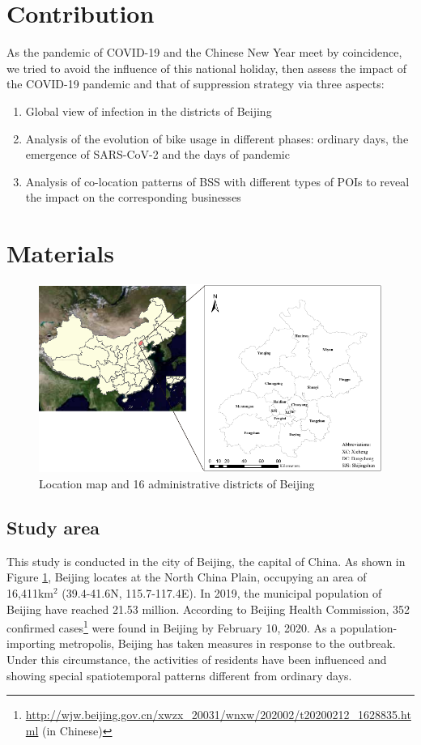 \documentclass[preprints,ijgi,submit,moreauthors]{Definitions/mdpi}
\begin{document}
\section*{Contribution} As the pandemic of COVID-19 and the Chinese New Year meet by coincidence, we tried to avoid the influence of this national holiday, then assess the impact of the COVID-19 pandemic and that of suppression strategy via three aspects:
\begin{enumerate}
    \item Global view of infection in the districts of Beijing
    \item Analysis of the evolution of bike usage in different phases: ordinary days, the emergence of SARS-CoV-2 and the days of pandemic 
    \item Analysis of co-location patterns of BSS with different types of POIs to reveal the impact on the corresponding businesses
\end{enumerate}

\section{Materials}

\begin{figure}[ht]
    \centering
    \includegraphics[width=\textwidth]{Figures/StudyArea.pdf}
    \caption{Location map and 16 administrative districts of Beijing}
    \label{fig:study_area}
\end{figure}

\subsection{Study area}
This study is conducted in the city of Beijing, the capital of China. 
As shown in Figure \ref{fig:study_area}, Beijing locates at the North China Plain, occupying an area of 16,411km$^2$ (39.4{\degree}-41.6{\degree}N, 115.7{\degree}-117.4{\degree}E). 
In 2019, the municipal population of Beijing have reached 21.53 million. According to Beijing Health Commission, 352 confirmed cases\footnote{\url{http://wjw.beijing.gov.cn/xwzx_20031/wnxw/202002/t20200212_1628835.html} (in Chinese)} were found in Beijing by February 10, 2020. 
As a population-importing metropolis, Beijing has taken measures in response to the outbreak. 
Under this circumstance, the activities of residents have been influenced and showing special spatiotemporal patterns different from ordinary days.
\end{document}
